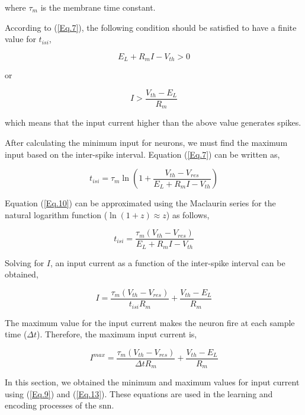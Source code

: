 \noindent where $\tau_{m}$ is the membrane time constant. 

According to (\ref{Eq.7}), the following condition should be satisfied to have a finite value for $t_{isi}$,

\begin{equation} \label{Eq.8}
    E_{L} + R_{m}I - V_{th} > 0
\end{equation}

\noindent or

\begin{equation} \label{Eq.9}
    I > \frac{V_{th} - E_{L}}{R_{m}}
\end{equation}

\noindent which means that the input current higher than the above value generates spikes. 

After calculating the minimum input for neurons, we must find the maximum input based on the inter-spike interval. Equation (\ref{Eq.7}) can be written as,

\begin{equation} \label{Eq.10}
    t_{isi} = \tau_{m}\ln\left(1+\frac{V_{th} - V_{res}}{E_{L} + R_{m}I - V_{th}}\right)
\end{equation}

\noindent Equation (\ref{Eq.10}) can be approximated using the Maclaurin series for the natural logarithm function ($\ln(1+z)\approx z$) as follows,

\begin{equation} \label{Eq.11}
    t_{isi} = \frac{\tau_{m}\left(V_{th} - V_{res}\right)}{E_{L} + R_{m}I - V_{th}}
\end{equation}

\noindent Solving for $I$, an input current as a function of the inter-spike interval can be obtained,

\begin{equation} \label{Eq.12}
    I = \frac{\tau_{m}\left(V_{th} - V_{res}\right)}{t_{isi}R_{m}} + \frac{V_{th} - E_{L}}{R_{m}}
\end{equation}

The maximum value for the input current makes the neuron fire at each sample time ($\Delta t$). Therefore, the maximum input current is,

\begin{equation} \label{Eq.13}
    I^{max} = \frac{\tau_{m}\left(V_{th} - V_{res}\right)}{\Delta t R_{m}} + \frac{V_{th} - E_{L}}{R_{m}}
\end{equation}

In this section, we obtained the minimum and maximum values for input current using (\ref{Eq.9}) and (\ref{Eq.13}). These equations are used in the learning and encoding processes of the \ac{snn}.

